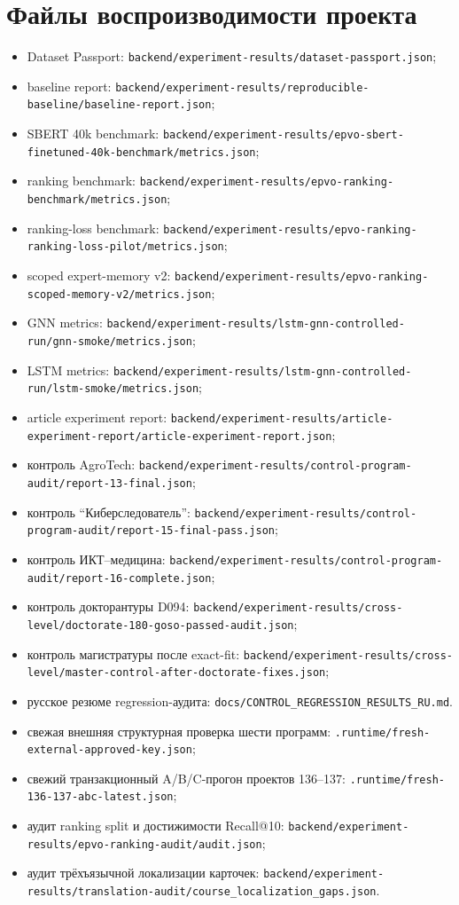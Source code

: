 \documentclass[twoside,11pt]{article}
\begin{document}
\section{Файлы воспроизводимости проекта}
\label{app:reproducibility}

\begin{itemize}
  \item Dataset Passport: \texttt{backend/experiment-results/dataset-passport.json};
  \item baseline report: \texttt{backend/experiment-results/reproducible-baseline/baseline-report.json};
  \item SBERT 40k benchmark: \texttt{backend/experiment-results/epvo-sbert-finetuned-40k-benchmark/metrics.json};
  \item ranking benchmark: \texttt{backend/experiment-results/epvo-ranking-benchmark/metrics.json};
  \item ranking-loss benchmark: \texttt{backend/experiment-results/epvo-ranking-ranking-loss-pilot/metrics.json};
  \item scoped expert-memory v2: \texttt{backend/experiment-results/epvo-ranking-scoped-memory-v2/metrics.json};
  \item GNN metrics: \texttt{backend/experiment-results/lstm-gnn-controlled-run/gnn-smoke/metrics.json};
  \item LSTM metrics: \texttt{backend/experiment-results/lstm-gnn-controlled-run/lstm-smoke/metrics.json};
  \item article experiment report: \texttt{backend/experiment-results/article-experiment-report/article-experiment-report.json};
  \item контроль AgroTech: \texttt{backend/experiment-results/control-program-audit/report-13-final.json};
  \item контроль ``Киберследователь'': \texttt{backend/experiment-results/control-program-audit/report-15-final-pass.json};
  \item контроль ИКТ--медицина: \texttt{backend/experiment-results/control-program-audit/report-16-complete.json};
  \item контроль докторантуры D094: \texttt{backend/experiment-results/cross-level/doctorate-180-goso-passed-audit.json};
  \item контроль магистратуры после exact-fit: \texttt{backend/experiment-results/cross-level/master-control-after-doctorate-fixes.json};
  \item русское резюме regression-аудита: \texttt{docs/CONTROL\_REGRESSION\_RESULTS\_RU.md}.
  \item свежая внешняя структурная проверка шести программ: \texttt{.runtime/fresh-external-approved-key.json};
  \item свежий транзакционный A/B/C-прогон проектов 136--137: \texttt{.runtime/fresh-136-137-abc-latest.json};
  \item аудит ranking split и достижимости Recall@10: \texttt{backend/experiment-results/epvo-ranking-audit/audit.json};
  \item аудит трёхъязычной локализации карточек: \texttt{backend/experiment-results/translation-audit/course\_localization\_gaps.json}.
\end{itemize}
\end{document}
